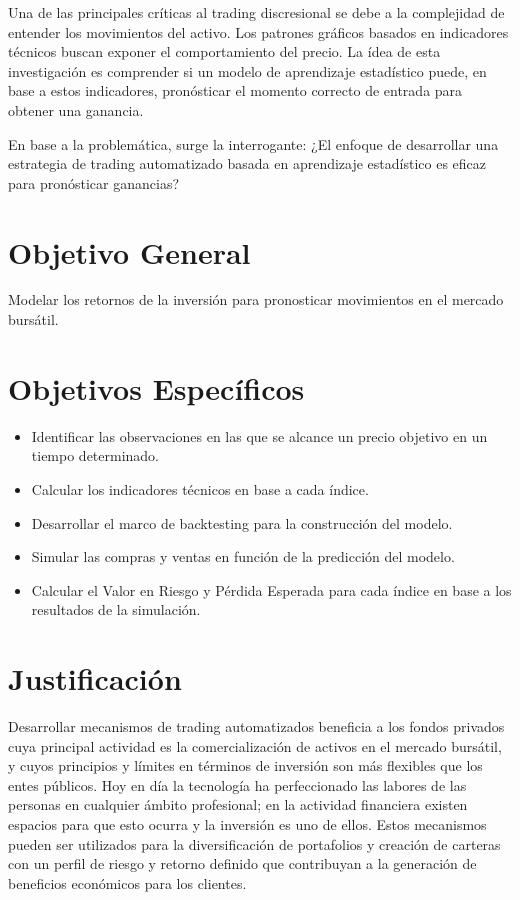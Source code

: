 \documentclass[a4paper,12pt]{Latex/Classes/PhDthesisPSnPDF}
\begin{document}
Una de las principales críticas al trading discresional se debe a la complejidad de entender los movimientos del activo. Los patrones gráficos basados en indicadores técnicos buscan exponer el comportamiento del precio. La ídea de esta investigación es comprender si un modelo de aprendizaje estadístico puede, en base a estos indicadores, pronósticar el momento correcto de entrada para obtener una ganancia.

En base a la problemática, surge la interrogante: ¿El enfoque de desarrollar una estrategia de trading automatizado basada en aprendizaje estadístico es eficaz para pronósticar ganancias?

\section{Objetivo General}

Modelar los retornos de la inversión para pronosticar movimientos en el mercado bursátil.

\section{Objetivos Específicos}

\begin{itemize}
\item Identificar las observaciones en las que se alcance un precio objetivo en un tiempo determinado.
\item Calcular los indicadores técnicos en base a cada índice.
\item Desarrollar el marco de backtesting para la construcción del modelo.
\item Simular las compras y ventas en función de la predicción del modelo.
\item Calcular el Valor en Riesgo y Pérdida Esperada para cada índice en base a los resultados de la simulación.
\end{itemize}

\section{Justificación}

Desarrollar mecanismos de trading automatizados beneficia a los fondos privados cuya principal actividad es la comercialización de activos en el mercado bursátil, y cuyos principios y límites en términos de inversión son más flexibles que los entes públicos. Hoy en día la tecnología ha perfeccionado las labores de las personas en cualquier ámbito profesional; en la actividad financiera existen espacios para que esto ocurra y la inversión es uno de ellos. Estos mecanismos pueden ser utilizados para la diversificación de portafolios y creación de carteras con un perfil de riesgo y retorno definido que contribuyan a la generación de beneficios económicos para los clientes.
\end{document}
